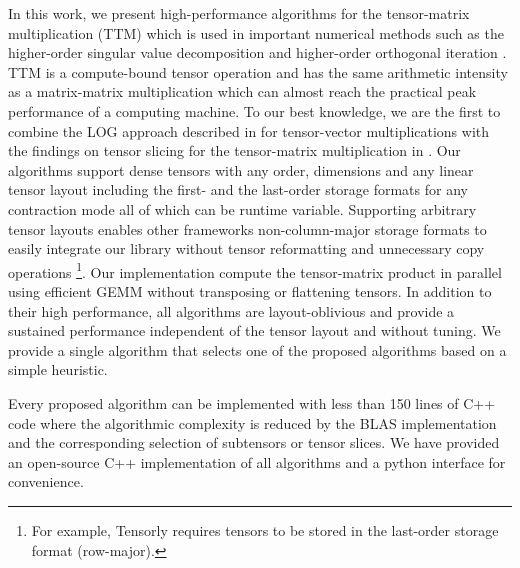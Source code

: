 In this work, we present high-performance algorithms for the tensor-matrix multiplication (TTM) which is used in important numerical methods such as the higher-order singular value decomposition and higher-order orthogonal iteration \citep{lathauwer:2000:hosvd, kolda:2009:decompositions, lee:2018:fundamental} .
TTM is a compute-bound tensor operation and has the same arithmetic intensity as a matrix-matrix multiplication which can almost reach the practical peak performance of a computing machine.
To our best knowledge, we are the first to combine the LOG approach described in \citep{bassoy:2019:ttv, pawlowski:2019:morton.tensor.computations} for tensor-vector multiplications with the findings on tensor slicing for the tensor-matrix multiplication in \citep{li:2015:input}.
Our algorithms support dense tensors with any order, dimensions and any linear tensor layout including the first- and the last-order storage formats for any contraction mode all of which can be runtime variable.
Supporting arbitrary tensor layouts enables other frameworks non-column-major storage formats to easily integrate our library without tensor reformatting and unnecessary copy operations%
\footnote{For example, Tensorly \citep{kossaifi:2019:tensorly} requires tensors to be stored in the last-order storage format (row-major).}.
Our implementation compute the tensor-matrix product in parallel using efficient GEMM without transposing or flattening tensors.
In addition to their high performance, all algorithms are layout-oblivious and provide a sustained performance independent of the tensor layout and without tuning.
We provide a single algorithm that selects one of the proposed algorithms based on a simple heuristic.

Every proposed algorithm can be implemented with less than 150 lines of C++ code where the algorithmic complexity is reduced by the BLAS implementation and the corresponding selection of subtensors or tensor slices.
We have provided an open-source C++ implementation of all algorithms and a python interface for convenience.

